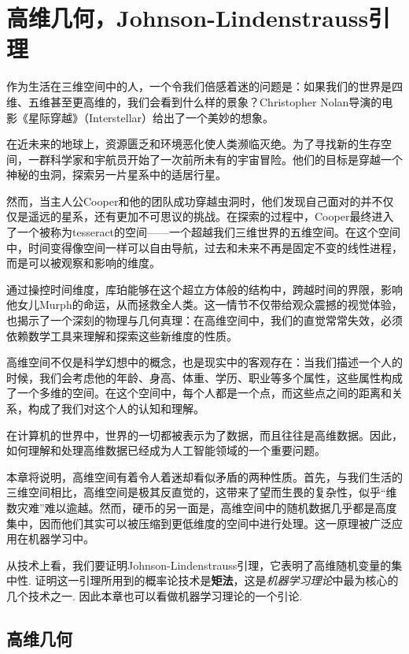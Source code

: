  \chapter{高维几何，Johnson-Lindenstrauss引理}\label{chap:J-L-Lemma}

作为生活在三维空间中的人，一个令我们倍感着迷的问题是：如果我们的世界是四维、五维甚至更高维的，我们会看到什么样的景象？Christopher Nolan导演的电影《星际穿越》（Interstellar）给出了一个美妙的想象。

在近未来的地球上，资源匮乏和环境恶化使人类濒临灭绝。为了寻找新的生存空间，一群科学家和宇航员开始了一次前所未有的宇宙冒险。他们的目标是穿越一个神秘的虫洞，探索另一片星系中的适居行星。

然而，当主人公Cooper和他的团队成功穿越虫洞时，他们发现自己面对的并不仅仅是遥远的星系，还有更加不可思议的挑战。在探索的过程中，Cooper最终进入了一个被称为tesseract的空间——一个超越我们三维世界的五维空间。在这个空间中，时间变得像空间一样可以自由导航，过去和未来不再是固定不变的线性进程，而是可以被观察和影响的维度。

通过操控时间维度，库珀能够在这个超立方体般的结构中，跨越时间的界限，影响他女儿Murph的命运，从而拯救全人类。这一情节不仅带给观众震撼的视觉体验，也揭示了一个深刻的物理与几何真理：在高维空间中，我们的直觉常常失效，必须依赖数学工具来理解和探索这些新维度的性质。

高维空间不仅是科学幻想中的概念，也是现实中的客观存在：当我们描述一个人的时候，我们会考虑他的年龄、身高、体重、学历、职业等多个属性，这些属性构成了一个多维的空间。在这个空间中，每个人都是一个点，而这些点之间的距离和关系，构成了我们对这个人的认知和理解。

在计算机的世界中，世界的一切都被表示为了数据，而且往往是高维数据。因此，如何理解和处理高维数据已经成为人工智能领域的一个重要问题。

本章将说明，高维空间有着令人着迷却看似矛盾的两种性质。首先，与我们生活的三维空间相比，高维空间是极其反直觉的，这带来了望而生畏的复杂性，似乎“维数灾难”难以逾越。然而，硬币的另一面是，高维空间中的随机数据几乎都是高度集中，因而他们其实可以被压缩到更低维度的空间中进行处理。这一原理被广泛应用在机器学习中。

从技术上看，我们要证明Johnson-Lindenstrauss引理，它表明了高维随机变量的集中性. 证明这一引理所用到的概率论技术是\textbf{矩法}，这是\emph{机器学习理论}中最为核心的几个技术之一. 因此本章也可以看做机器学习理论的一个引论. 

\section{高维几何}

